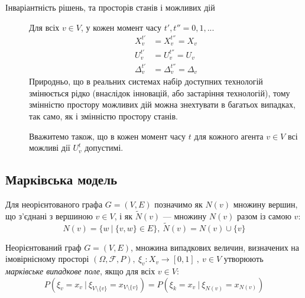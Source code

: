 \documentclass[oneside,14pt]{extarticle}
\begin{document}
\begin{description}
    \item[Інваріантність рішень, та просторів станів і можливих дій] Для всіх \(v \in V\), у кожен момент часу \(t', t'' = 0, 1, ...\ \)
    \begin{align*}
      X_v^{t'} &= X_v^{t''} = X_v \\
      U_v^{t'} &= U_v^{t''} = U_v \\
	  \Delta_v^{t'} &= \Delta_v^{t''} = \Delta_v
    \end{align*}
	Природньо, що в реальних системах набір доступних технологій змінюється рідко (внаслідок інновацій, або застаріння технологій), тому змінністю простору можливих дій можна знехтувати в багатьох випадках, так само, як і змінністю простору станів.
	
	Вважитемо також, що в кожен момент часу \(t\) для кожного агента \(v \in V\) всі можливі дії \(U_v^t\) допустимі.

\end{description}







\subsection{Марківська модель}

Для неорієнтованого графа \(G = (V, E)\) позначимо як \(N(v)\) множину вершин, що з’єднані з вершиною \(v \in V\), і як \(\tilde{N}(v)\) — множину \(N(v)\) разом із самою \(v\):
\[N(v) = \{w\ |\ \{v, w\} \in E\},\ \tilde{N}(v) = N(v) \cup \{v\}\]

\begin{definition}
Неорієнтований граф \(G = (V, E)\), множина випадкових величин, визначених на імовірнісному просторі \((\Omega, \mathcal{F}, P),\ \xi_v : X_v \rightarrow [0, 1]\ ,\ v \in V\) утворюють \textit{марківське випадкове поле}, якщо для всіх \(v \in V\):
\[P(\xi_v = x_v\ |\ \xi_{V\setminus\{v\}} = x_{V\setminus\{v\}}) = P(\xi_k = x_v\ |\ \xi_{N(v)} = x_{N(v)})\]
\end{definition}
\end{document}
